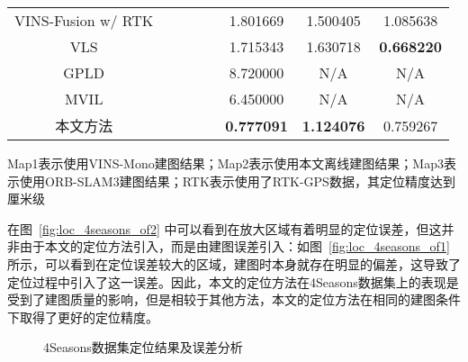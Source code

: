\begin{table}
\begin{tabular}{c|cccc|ccc}
VINS-Fusion w/  RTK &                                                                            &                      &                      &                      & 1.801669          & 1.500405          & 1.085638          \\
VLS                                    &                                                                            &                      &                      &                      & 1.715343          & 1.630718          & \cellcolor[HTML]{FA7F6F}\textbf{0.668220} \\
GPLD                                   &                                                                            &                      &                      &                      & 8.720000          & N/A               & N/A               \\
MVIL                                   &                                                                            &                      &                      &                      & 6.450000          & N/A               & N/A               \\
本文方法                                   &                                                                            &                      &                      &                      & \cellcolor[HTML]{FA7F6F}\textbf{0.777091} & \cellcolor[HTML]{FA7F6F}\textbf{1.124076} & 0.759267          \\ \bottomrule
\end{tabular}
\label{tab:loc_4seasons_1}
\begin{tablenotes}
  \footnotesize
  \item Map1表示使用VINS-Mono建图结果；Map2表示使用本文离线建图结果；Map3表示使用ORB-SLAM3建图结果；RTK表示使用了RTK-GPS数据，其定位精度达到厘米级
\end{tablenotes}
\end{table}

在图~\ref{fig:loc_4seasons_of2} 中可以看到在放大区域有着明显的定位误差，但这并非由于本文的定位方法引入，而是由建图误差引入：如图~\ref{fig:loc_4seasons_of1} 所示，可以看到在定位误差较大的区域，建图时本身就存在明显的偏差，这导致了定位过程中引入了这一误差。因此，本文的定位方法在4Seasons数据集上的表现是受到了建图质量的影响，但是相较于其他方法，本文的定位方法在相同的建图条件下取得了更好的定位精度。

\begin{figure}
  \centering
  \caption{4Seasons数据集定位结果及误差分析}
  \label{fig:loc_gnssmap}
\end{figure}

